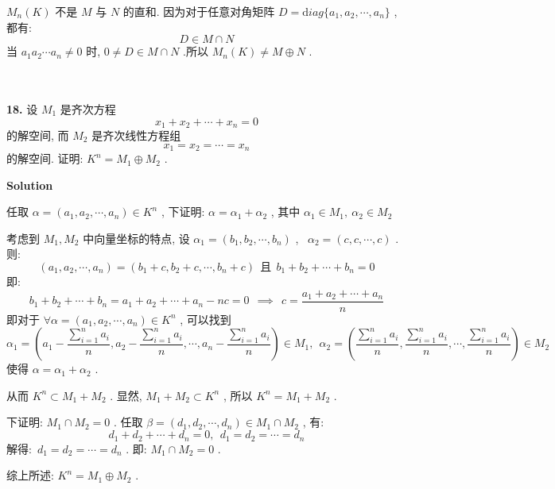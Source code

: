 \documentclass[11pt,a4paper,openany,oneside]{book}
\newcommand{\diag}{\mathrm diag}
\newcommand\Solution{\noindent\textbf{\textsf{Solution}}\par\medskip}
\begin{document}
 $ M_n(K) $ 不是 $ M $ 与 $ N $ 的直和. 因为对于任意对角矩阵 $ D = \diag\{a_1, a_2, \cdots, a_n\} $ , 都有:
 $$  D \in M \cap N  $$ 
\hspace{1.7em} 当 $ a_1a_2\cdots a_n \neq 0 $ 时,  $ 0 \neq D \in M \cap N $ .所以 $ M_n(K) \neq M \oplus  N $ . \\  \\ \\



\begin{myexample}
	\textbf{18.} 
设 $ M_1 $ 是齐次方程
 $$  x_1 + x_2 + \cdots + x_n = 0  $$ 
的解空间, 而 $ M_2 $ 是齐次线性方程组
 $$  x_1 = x_2 = \cdots = x_n  $$ 
的解空间. 证明:  $  K^n = M_1 \oplus  M_2  $ .  \\  

\end{myexample}
\Solution 

任取 $ \alpha = (a_1, a_2, \cdots, a_n) \in K^n $ , 下证明:  $ \alpha = \alpha_1 + \alpha_2 $ , 其中  $ \alpha_1 \in M_1, \ \alpha_2 \in M_2 $  

考虑到 $ M_1, M_2 $ 中向量坐标的特点, 设 $ \alpha_1 = (b_1, b_2, \cdots, b_n) $ , \  $ \alpha_2 = (c, c, \cdots, c) $ . 则: 
 $$  (a_1, a_2, \cdots, a_n) = (b_1 + c, b_2 + c, \cdots, b_n + c) \ \ \text{且} \ \ b_1 + b_2 + \cdots + b_n = 0  $$ 
即: 
 $$  b_1 + b_2 + \cdots + b_n = a_1 + a_2 + \cdots + a_n - nc = 0 \ \ \implies \ \ c = \dfrac{a_1 + a_2 + \cdots + a_n}{n}  $$ 
即对于 $ \forall \alpha=(a_1, a_2, \cdots, a_n) \in K^n $ , 可以找到
 $$ \alpha_1 = \left(a_1 - \frac{\sum\limits_{i=1}^{n}a_i}{n}, a_2 -\frac{\sum\limits_{i=1}^{n}a_i}{n}, \cdots, a_n-\frac{\sum\limits_{i=1}^{n}a_i}{n} \right) \in M_1, \ \  \alpha_2 = \left(\frac{\sum\limits_{i=1}^{n}a_i}{n}, \frac{\sum\limits_{i=1}^{n}a_i}{n}, \cdots, \frac{\sum\limits_{i=1}^{n}a_i}{n} \right) \in M_2 $$ 
使得 $ \alpha = \alpha_1 + \alpha_2 $ . 

从而 $ K^n \subset M_1 + M_2 $ . 显然,  $ M_1 + M_2 \subset K^n $ , 所以  $ K^n = M_1 + M_2 $ .  

下证明:  $ M_1 \cap M_2 = 0 $ . 任取 $ \beta = (d_1, d_2, \cdots, d_n) \in M_1 \cap M_2 $ , 有:
 $$  d_1 + d_2 + \cdots + d_n = 0, \ \ d_1 = d_2 = \cdots = d_n  $$ 
解得:\  $ d_1 = d_2 = \cdots = d_n $ . 即:  $ M_1 \cap M_2 = 0 $ .

综上所述:  $ K^n = M_1 \oplus  M_2 $ .   \\  \\  \\ 
\end{document}
